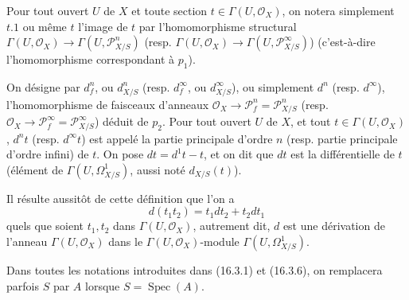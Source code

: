 Pour tout ouvert $U$ de $X$ et toute section $t\in\Gamma(U,\mathcal{O}_X)$, on
notera simplement $t.1$ ou même $t$ l'image de $t$ par l'homomorphisme
structural $\Gamma(U,\mathcal{O}_X)\to\Gamma(U,\mathscr{P}_{X/S}^n)$ (resp.
$\Gamma(U,\mathcal{O}_X)\to\Gamma(U,\mathscr{P}_{X/S}^\infty)$)
(c'est-à-dire l'homomorphisme correspondant à $p_1$).

\begin{definition}[16.3.6]
On désigne par $d_f^n$, ou $d_{X/S}^n$ (resp. $d_f^\infty$, ou
$d_{X/S}^\infty$), ou simplement $d^n$ (resp. $d^\infty$), l'homomorphisme de
faisceaux d'anneaux $\mathcal{O}_X\to\mathscr{P}_f^n=\mathscr{P}_{X/S}^n$
(resp. $\mathcal{O}_X\to\mathscr{P}_f^\infty=\mathscr{P}_{X/S}^\infty$)
déduit de $p_2$. Pour tout ouvert $U$ de $X$, et tout
$t\in\Gamma(U,\mathcal{O}_X)$, $d^nt$ (resp. $d^\infty t$) est appelé la partie
principale d'ordre $n$ (resp. partie principale d'ordre infini) de $t$. On pose
$dt=d^1t-t$, et on dit que $dt$ est la différentielle de $t$ (élément de
$\Gamma(U,\Omega_{X/S}^1)$, aussi noté $d_{X/S}(t)$).
\end{definition}

Il résulte aussitôt de cette définition que l'on a
\[
  d(t_1t_2)=t_1dt_2+t_2dt_1
  \tag{16.3.6.1}
  \label{IV.16.3.6.1}
\]
quels que soient $t_1,t_2$ dans $\Gamma(U,\mathcal{O}_X)$, autrement dit, $d$
est une dérivation de l'anneau $\Gamma(U,\mathcal{O}_X)$ dans le
$\Gamma(U,\mathcal{O}_X)$-module $\Gamma(U,\Omega_{X/S}^1)$.

Dans toutes les notations introduites dans (16.3.1) et (16.3.6), on remplacera
parfois $S$ par $A$ lorsque $S=\operatorname{Spec}(A)$.

